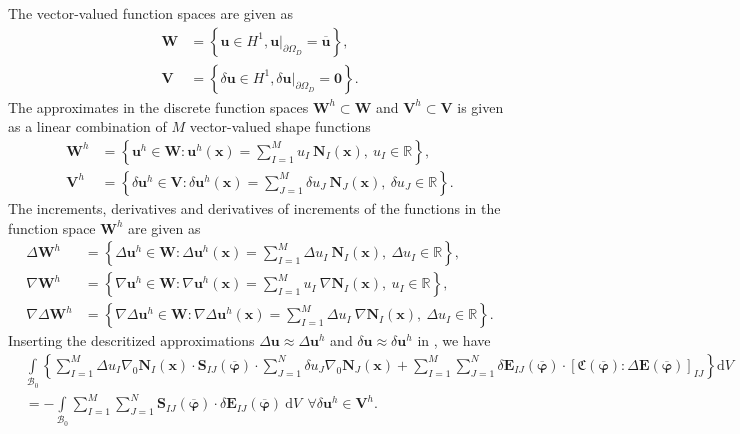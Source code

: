 The vector-valued function spaces are given as 
\begin{align}
\mathbf{W} &= \left\lbrace \mathbf{u} \in H^1, \mathbf{u} \big|_{\partial \Omega_D} = \overline{\mathbf{u}} \right\rbrace, \\
\mathbf{V} &= \left\lbrace \delta\mathbf{u} \in H^1, \delta\mathbf{u} \big|_{\partial \Omega_D} = \mathbf{0} \right\rbrace.
\end{align}
The approximates in the discrete function spaces $\mathbf{W}^h \subset \mathbf{W}$ and $\mathbf{V}^h \subset \mathbf{V}$ is given as a linear combination of $M$ vector-valued shape functions
\begin{align}
\mathbf{W}^h &= \left\lbrace \mathbf{u}^h \in \mathbf{W} : \mathbf{u}^h (\mathbf{x}) = \sum\limits_{I=1}^{M} u_I \ \mathbf{N}_I (\mathbf{x}), \ u_I \in \mathbb{R} \right\rbrace, \nonumber\\
\mathbf{V}^h &= \left\lbrace \delta\mathbf{u}^h \in \mathbf{V} : \delta\mathbf{u}^h (\mathbf{x}) = \sum\limits_{J=1}^{M} \delta u_J \ \mathbf{N}_J (\mathbf{x}), \ \delta u_J \in \mathbb{R} \right\rbrace.
\end{align}
The increments, derivatives and derivatives of increments of the functions in the function space $\mathbf{W}^h$ are given as
\begin{align}
\Delta\mathbf{W}^h &= \left\lbrace \Delta\mathbf{u}^h \in \mathbf{W} : \Delta\mathbf{u}^h (\mathbf{x}) = \sum\limits_{I=1}^{M} \Delta u_I \ \mathbf{N}_I (\mathbf{x}), \ \Delta u_I \in \mathbb{R} \right\rbrace, \\
\nabla\mathbf{W}^h &= \left\lbrace \nabla\mathbf{u}^h \in \mathbf{W} : \nabla\mathbf{u}^h (\mathbf{x}) = \sum\limits_{I=1}^{M} u_I \ \nabla\mathbf{N}_I (\mathbf{x}), \ u_I \in \mathbb{R} \right\rbrace, \\
\nabla \Delta\mathbf{W}^h &= \left\lbrace \nabla \Delta\mathbf{u}^h \in \mathbf{W} : \nabla \Delta\mathbf{u}^h (\mathbf{x}) = \sum\limits_{I=1}^{M} \Delta u_I \ \nabla\mathbf{N}_I (\mathbf{x}), \ \Delta u_I \in \mathbb{R} \right\rbrace.
\end{align}
Inserting the descritized approximations $\Delta \mathbf{u}\approx \Delta \mathbf{u}^h$ and $\delta \mathbf{u} \approx \delta \mathbf{u}^h$ in , we have
\begin{align}
&\int\limits_{\mathcal{B}_0} \left\lbrace \sum\limits_{I=1}^{M} \Delta u_I \nabla_0 \mathbf{N}_I(\mathbf{x}) \cdot \mathbf{S}_{IJ}(\overline{\bm{\varphi}}) \cdot \sum\limits_{J=1}^{N} \delta u_J \nabla_0 \mathbf{N}_J(\mathbf{x}) + \sum\limits_{I=1}^{M} \sum\limits_{J=1}^{N} \delta \mathbf{E}_{IJ}(\overline{\bm{\varphi}}) \cdot \left[ \mathfrak{C}(\overline{\bm{\varphi}}) : \Delta \mathbf{E}(\overline{\bm{\varphi}}) \right]_{IJ} \right\rbrace \mathrm{d}V \nonumber \\
&= -\int\limits_{\mathcal{B}_0} \sum\limits_{I=1}^{M} \sum\limits_{J=1}^{N} \mathbf{S}_{IJ}(\overline{\bm{\varphi}}) \cdot \delta \mathbf{E}_{IJ}(\overline{\bm{\varphi}}) \ \mathrm{d}V \ \ \forall \delta \mathbf{u}^h \in \mathbf{V}^h.
\end{align}
